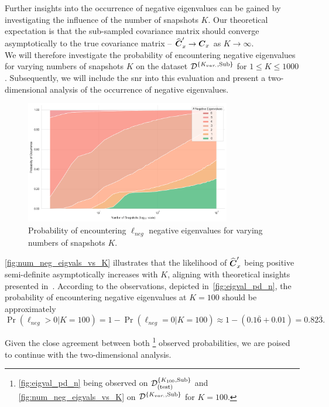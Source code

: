 Further insights into the occurrence of negative eigenvalues can be gained by investigating the influence of the number of
snapshots \( K \). Our theoretical expectation is that the sub-sampled covariance matrix should converge asymptotically to the true covariance
matrix -- \( \widehat{\boldsymbol{C}}'_x \rightarrow \boldsymbol{C}_x \) as \( K \rightarrow \infty \). \\
We will therefore investigate the probability of encountering negative eigenvalues for varying numbers of snapshots \( K \)
on the dataset \( \mathcal{D}^{\{K_{var.},\text{Sub}\}} \) for \( 1 \leq K \leq 1000 \). Subsequently, we will include the \gls{snr} into this evaluation
and present a two-dimensional analysis of the occurrence of negative eigenvalues.

\begin{figure}[H]
    \centering
    \includegraphics[width=0.8\textwidth]{figures/04_ModelOrderEstimation/num_neg_eigvals_vs_K.png}
    \caption{Probability of encountering \( \ell_{\textit{neg}} \) negative eigenvalues for varying numbers of snapshots \( K \).}
    \label{fig:num_neg_eigvals_vs_K}
\end{figure}

\autoref{fig:num_neg_eigvals_vs_K} illustrates that the likelihood of \( \widehat{\boldsymbol{C}}'_x \) being positive semi-definite asymptotically
increases with \( K \), aligning with theoretical insights presented in~\cite{meyer}.
According to the observations, depicted in~\autoref{fig:eigval_pd_n}, the probability of encountering negative eigenvalues
at \( K = 100 \) should be approximately
\[
    \Pr(\ell_{\textit{neg}} > 0|K=100) = 1 - \Pr(\ell_{\textit{neg}} = 0| K=100) \approx  1 - (0.1\overline{6} + 0.01) = 0.82\overline{3}.
\]

Given the close agreement between both%
\footnote{\autoref{fig:eigval_pd_n} being observed on \( \mathcal{D}^{\{K_{100},\text{Sub}\}}_{(\text{test})} \) and \autoref{fig:num_neg_eigvals_vs_K} on \( \mathcal{D}^{\{K_{var.},\text{Sub}\}} \) for \(K = 100\).}
observed probabilities, we are poised to continue with the two-dimensional analysis.



